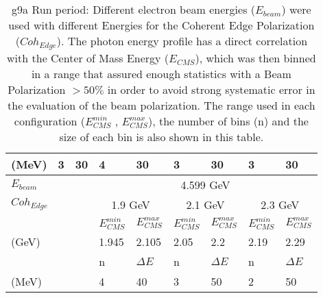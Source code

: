 \begin{table}[h]
\begin{center}
\begin{tabular}{ |l||l|l||l|l||l|l||l|l||}
      (MeV) & 3 & 30 & 4 & 30 & 3 & 30 &3 &30 \\
      \hline
      \hline
      \multicolumn{3}{|l||}{$E_{beam}$} &  \multicolumn{6}{|c||}{4.599 GeV} \\
      \hline
      \multicolumn{3}{|l||}{$Coh_{Edge}$} &  \multicolumn{2}{|c||}{1.9 GeV} &  \multicolumn{2}{|c||}{2.1 GeV} &  \multicolumn{2}{|c||}{2.3 GeV}  \\
      \hline
      \multicolumn{3}{|l||}{} & $E_{CMS}^{min} $ &  $E_{CMS}^{max} $& $E_{CMS}^{min} $ &  $E_{CMS}^{max} $ & $E_{CMS}^{min} $ &  $E_{CMS}^{max} $ \\
      \multicolumn{3}{|l||}{(GeV)} & 1.945 & 2.105 & 2.05 & 2.2 & 2.19 & 2.29 \\
      \hline
      \multicolumn{3}{|l||}{} & n  &  $\Delta E$ & n  &  $\Delta E$ & n  &  $\Delta E$ \\
      \multicolumn{3}{|l||}{(MeV)} & 4 & 40 & 3 & 50 & 2 & 50  \\
      \hline
    \end{tabular}
  \end{center}
  \caption{g9a Run period: Different electron beam energies ($E_{beam}$) were used with different Energies for the Coherent Edge Polarization ($Coh_{Edge}$). The photon energy profile has a direct correlation with the Center of Mass Energy ($E_{CMS}$), which was then binned in a range that assured enough statistics with a Beam Polarization $>50\%$ in order to avoid strong systematic error in the evaluation of the beam polarization. The range used in each configuration ($E_{CMS}^{min} $ ,  $E_{CMS}^{max}$), the number of bins (n) and the size of each bin is also shown in this table.}
  \label{table:g9a_conf_color}
\end{table}

